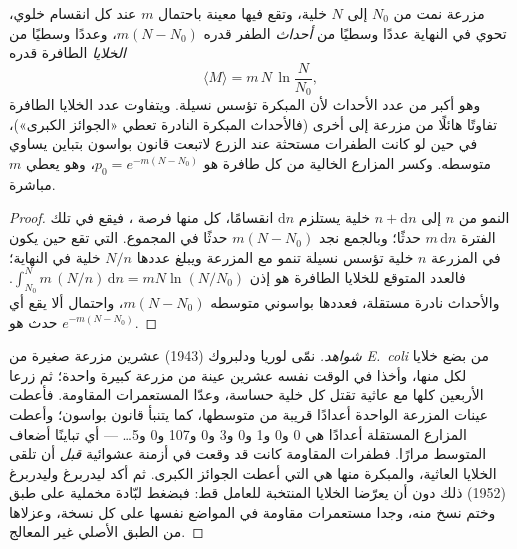 \begin{theorem}\label{thm:b2:genome-diversification:luria}
مزرعة نمت من $N_0$ إلى $N$ خلية، وتقع فيها  معينة باحتمال $m$
عند كل انقسام خلوي، تحوي في النهاية عددًا وسطيًا من \emph{أحداث}
الطفر قدره $m(N - N_0)$، وعددًا وسطيًا من \emph{الخلايا} الطافرة
قدره
\[
\langle M\rangle = m\,N\,\ln\frac{N}{N_0},
\]
وهو أكبر من عدد الأحداث لأن  المبكرة تؤسس نسيلة. ويتفاوت عدد
الخلايا الطافرة تفاوتًا هائلًا من مزرعة إلى أخرى (فالأحداث المبكرة
النادرة تعطي «الجوائز الكبرى»)، في حين لو كانت الطفرات مستحثة عند
الزرع لاتبعت قانون بواسون بتباين يساوي متوسطه. وكسر المزارع الخالية
من كل طافرة هو $p_0 = e^{-m(N - N_0)}$، وهو يعطي $m$ مباشرة.
\end{theorem}
\begin{proof}
النمو من $n$ إلى $n + \mathrm{d}n$ خلية يستلزم $\mathrm{d}n$
انقسامًا، كل منها فرصة ، فيقع في تلك الفترة $m\,\mathrm{d}n$
حدثًا؛ وبالجمع نجد $m(N - N_0)$ حدثًا في المجموع.  التي تقع
حين يكون في المزرعة $n$ خلية تؤسس نسيلة تنمو مع المزرعة ويبلغ عددها
$N/n$ خلية في النهاية؛ فالعدد المتوقع للخلايا الطافرة هو إذن
$\int_{N_0}^{N} m\,(N/n)\,\mathrm{d}n = mN\ln(N/N_0)$. والأحداث
نادرة مستقلة، فعددها بواسوني متوسطه
$m(N - N_0)$، واحتمال ألا يقع أي حدث هو $e^{-m(N - N_0)}$.
\end{proof}
\begin{proof}[شواهد]
نمّى لوريا ودلبروك (1943) عشرين مزرعة صغيرة من \emph{E.~coli} من
بضع خلايا لكل منها، وأخذا في الوقت نفسه عشرين عينة من مزرعة كبيرة
واحدة؛ ثم زرعا الأربعين كلها مع عاثية تقتل كل خلية حساسة، وعدّا
المستعمرات المقاومة. فأعطت عينات المزرعة الواحدة أعدادًا قريبة من
متوسطها، كما يتنبأ قانون بواسون؛ وأعطت المزارع المستقلة أعدادًا هي
0 و0 و1 و0 و3 و0 و107 و0 و5\dots{} --- أي تباينًا أضعاف المتوسط
مرارًا. فطفرات المقاومة كانت قد وقعت في أزمنة عشوائية \emph{قبل} أن
تلقى الخلايا العاثية، والمبكرة منها هي التي أعطت الجوائز الكبرى. ثم
أكد ليدربرغ وليدربرغ (1952) ذلك دون أن يعرّضا الخلايا المنتخبة
للعامل قط: فبضغط لبّادة مخملية على طبق وختم نسخ منه، وجدا مستعمرات
مقاومة في المواضع نفسها على كل نسخة، وعزلاها من الطبق الأصلي غير
المعالج.
\end{proof}

